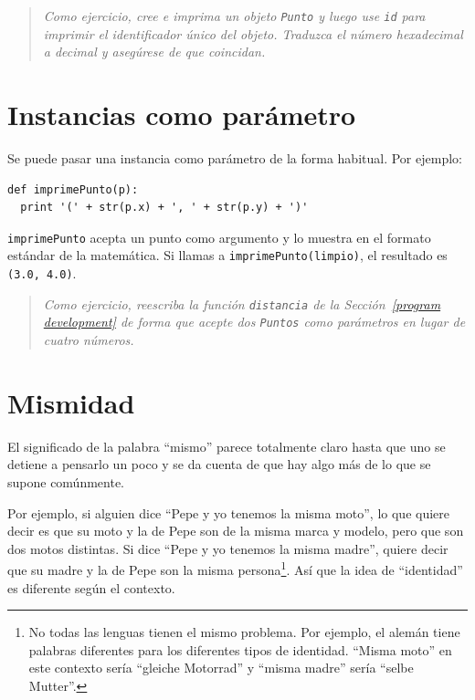
\begin{quote}
{\em Como ejercicio, cree e imprima un objeto \texttt{Punto} y luego use
\texttt{id} para imprimir el identificador único del objeto. Traduzca 
el número hexadecimal a decimal y asegúrese de que coincidan.}
\end{quote}


\section{Instancias como parámetro}

Se puede pasar una instancia como parámetro de la forma habitual.
Por ejemplo:

\beforeverb
\begin{verbatim}
def imprimePunto(p):
  print '(' + str(p.x) + ', ' + str(p.y) + ')'
\end{verbatim}
\afterverb
%
\texttt{imprimePunto} acepta un punto como argumento y lo muestra
en el formato estándar de la matemática. Si llamas a \texttt{imprimePunto(limpio)}, el
resultado es \texttt{(3.0, 4.0)}.

\begin{quote}
{\em Como ejercicio, reescriba la función \texttt{distancia} de la
Sección~\ref{program development} de forma que acepte dos \texttt{Puntos} como
parámetros en lugar de cuatro números.}
\end{quote}


\section{Mismidad}

El significado de la palabra ``mismo'' parece totalmente claro hasta
que uno se detiene a pensarlo un poco y se da cuenta de que hay
algo más de lo que se supone comúnmente.


Por ejemplo, si alguien dice ``Pepe y yo tenemos la misma moto'', lo que quiere decir
es que su moto y la de Pepe son de la misma marca y modelo, pero que son dos motos
distintas. Si dice ``Pepe y yo tenemos la misma madre'', quiere decir que su madre
y la de Pepe son la misma persona\footnote{No todas las lenguas tienen el mismo
problema. Por ejemplo, el alemán tiene palabras diferentes para los diferentes
tipos de identidad. ``Misma moto'' en este contexto sería ``gleiche Motorrad'' y ``misma
madre'' sería ``selbe Mutter''.}. Así que la idea de ``identidad'' es diferente según
el contexto.

